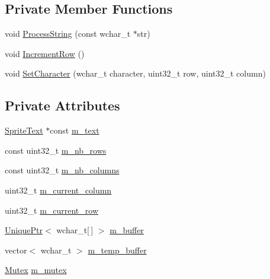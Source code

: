 \subsection*{Private Member Functions}
\begin{DoxyCompactItemize}
\item 
void \hyperlink{classmage_1_1_text_console_script_ac1e1d4768ead2de82493ab487449bbd8}{Process\+String} (const wchar\+\_\+t $\ast$str)
\item 
void \hyperlink{classmage_1_1_text_console_script_a0e82c5d5b84499bf4ed2233cf26145fa}{Increment\+Row} ()
\item 
void \hyperlink{classmage_1_1_text_console_script_a08324571bfbe793eafedc22126e575b9}{Set\+Character} (wchar\+\_\+t character, uint32\+\_\+t row, uint32\+\_\+t column)
\end{DoxyCompactItemize}
\subsection*{Private Attributes}
\begin{DoxyCompactItemize}
\item 
\hyperlink{classmage_1_1_sprite_text}{Sprite\+Text} $\ast$const \hyperlink{classmage_1_1_text_console_script_a43ef712ae52d2776edba574d32f759bc}{m\+\_\+text}
\item 
const uint32\+\_\+t \hyperlink{classmage_1_1_text_console_script_ac2e2d9630355f22945259d5a0af135ef}{m\+\_\+nb\+\_\+rows}
\item 
const uint32\+\_\+t \hyperlink{classmage_1_1_text_console_script_a6a4f3fdc2fb4be3c01e83363c5d7f631}{m\+\_\+nb\+\_\+columns}
\item 
uint32\+\_\+t \hyperlink{classmage_1_1_text_console_script_ac08f796712a2dc5d6e78a3f558272dff}{m\+\_\+current\+\_\+column}
\item 
uint32\+\_\+t \hyperlink{classmage_1_1_text_console_script_aedb5aebdee16791c69e0143525ee9d10}{m\+\_\+current\+\_\+row}
\item 
\hyperlink{namespacemage_a3316d7143a973e37adf1110f2e80ca31}{Unique\+Ptr}$<$ wchar\+\_\+t\mbox{[}$\,$\mbox{]} $>$ \hyperlink{classmage_1_1_text_console_script_a526410b1b43646948809b772c5446346}{m\+\_\+buffer}
\item 
vector$<$ wchar\+\_\+t $>$ \hyperlink{classmage_1_1_text_console_script_a6500bfd006f5c90d05f3da7f3e8e75a8}{m\+\_\+temp\+\_\+buffer}
\item 
\hyperlink{structmage_1_1_mutex}{Mutex} \hyperlink{classmage_1_1_text_console_script_a7212b01c007fc3d2fd11620c570f1c55}{m\+\_\+mutex}
\end{DoxyCompactItemize}

